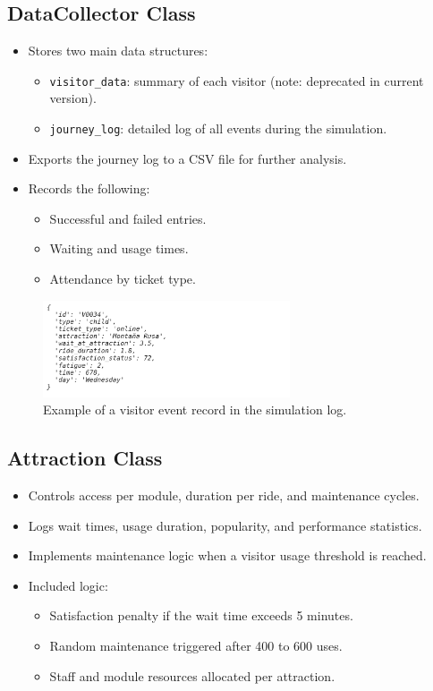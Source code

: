 \documentclass[12pt]{article}
\begin{document}
\subsection{DataCollector Class}

\begin{itemize}
\item Stores two main data structures:
\begin{itemize}
    \item \texttt{visitor\_data}: summary of each visitor (note: deprecated in current version).
    \item \texttt{journey\_log}: detailed log of all events during the simulation.
\end{itemize}
\item Exports the journey log to a CSV file for further analysis.
\item Records the following:
\begin{itemize}
    \item Successful and failed entries.
    \item Waiting and usage times.
    \item Attendance by ticket type.
\end{itemize}
\end{itemize}

\begin{figure}[H]
    \centering
    \includegraphics[width=0.65\textwidth]{visitor_data_dict.png}
    \caption{Example of a visitor event record in the simulation log.}
    \label{fig:visitor-data-dict}
\end{figure}

\subsection{Attraction Class}

\begin{itemize}
\item Controls access per module, duration per ride, and maintenance cycles.
\item Logs wait times, usage duration, popularity, and performance statistics.
\item Implements maintenance logic when a visitor usage threshold is reached.
\item Included logic:
\begin{itemize}
    \item Satisfaction penalty if the wait time exceeds 5 minutes.
    \item Random maintenance triggered after 400 to 600 uses.
    \item Staff and module resources allocated per attraction.
\end{itemize}
\end{itemize}
\end{document}
